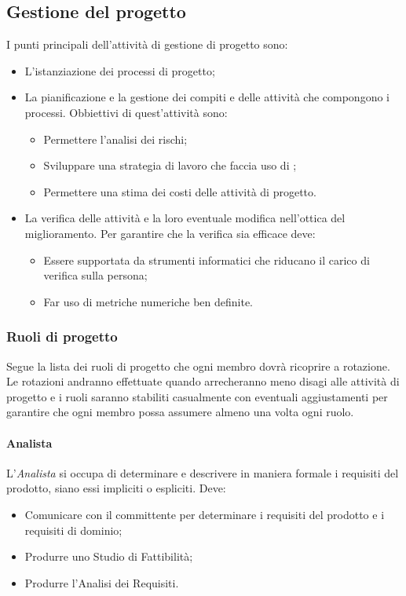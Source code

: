 \subsection{Gestione del progetto}
I punti principali dell'attività di gestione di progetto sono:
\begin{itemize}
\item L'istanziazione dei processi di progetto;
\item La pianificazione e la gestione dei compiti e delle attività che compongono i processi.
\newline
Obbiettivi di quest'attività sono:
\begin{itemize}
\item Permettere l'analisi dei rischi;
\item Sviluppare una strategia di lavoro che faccia uso di ;
\item Permettere una stima dei costi delle attività di progetto.
\end{itemize}
\item La verifica delle attività e la loro eventuale modifica nell'ottica del miglioramento.
\newline
Per garantire che la verifica sia efficace deve:
\begin{itemize}
\item Essere supportata da strumenti informatici che riducano il carico di verifica sulla persona;
\item Far uso di metriche numeriche ben definite.
\end{itemize}
\end{itemize}

\subsubsection{Ruoli di progetto}
Segue la lista dei ruoli di progetto che ogni membro dovrà ricoprire a rotazione.
Le rotazioni andranno effettuate quando arrecheranno meno disagi alle attività di progetto e i ruoli saranno stabiliti casualmente con eventuali aggiustamenti per garantire che ogni membro possa assumere almeno una volta ogni ruolo.

\paragraph{Analista} \Spazio
L'\emph{Analista} si occupa di determinare e descrivere in maniera formale i requisiti del prodotto, siano essi impliciti o espliciti. Deve:
\begin{itemize}
\item Comunicare con il committente per determinare i requisiti del prodotto e i requisiti di dominio;
\item Produrre uno Studio di Fattibilità;
\item Produrre l'Analisi dei Requisiti.
\end{itemize}

